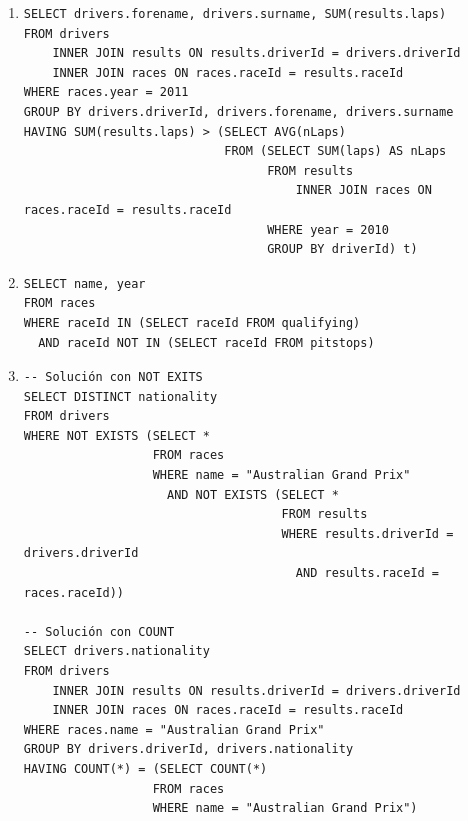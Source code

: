 \documentclass[a4paper]{article}
\begin{document}
\begin{enumerate}
    \item %
    \begin{verbatim}  
SELECT drivers.forename, drivers.surname, SUM(results.laps)
FROM drivers
	INNER JOIN results ON results.driverId = drivers.driverId
    INNER JOIN races ON races.raceId = results.raceId
WHERE races.year = 2011
GROUP BY drivers.driverId, drivers.forename, drivers.surname
HAVING SUM(results.laps) > (SELECT AVG(nLaps)
							FROM (SELECT SUM(laps) AS nLaps
								  FROM results
									  INNER JOIN races ON races.raceId = results.raceId
								  WHERE year = 2010
								  GROUP BY driverId) t)
    \end{verbatim}
    
    \item %
    \begin{verbatim}  
SELECT name, year
FROM races
WHERE raceId IN (SELECT raceId FROM qualifying)
  AND raceId NOT IN (SELECT raceId FROM pitstops)
    \end{verbatim}
    
    \item %
    \begin{verbatim}  
-- Solución con NOT EXITS
SELECT DISTINCT nationality
FROM drivers
WHERE NOT EXISTS (SELECT *
                  FROM races
                  WHERE name = "Australian Grand Prix"
                    AND NOT EXISTS (SELECT *
                                    FROM results
                                    WHERE results.driverId = drivers.driverId
                                      AND results.raceId = races.raceId))
                                      
-- Solución con COUNT
SELECT drivers.nationality
FROM drivers
	INNER JOIN results ON results.driverId = drivers.driverId
    INNER JOIN races ON races.raceId = results.raceId
WHERE races.name = "Australian Grand Prix"
GROUP BY drivers.driverId, drivers.nationality
HAVING COUNT(*) = (SELECT COUNT(*)
                  FROM races
                  WHERE name = "Australian Grand Prix")
    \end{verbatim}
       

\end{enumerate}
\end{document}
